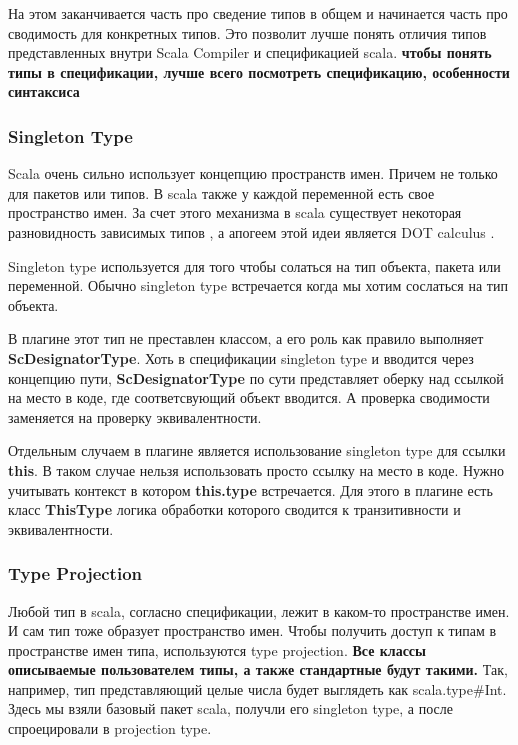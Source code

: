 На этом заканчивается часть про сведение типов в общем и начинается часть про
сводимость для конкретных типов.
Это позволит лучше понять отличия типов представленных внутри Scala Compiler
и спецификацией scala.
\textbf{чтобы понять типы в спецификации, лучше всего посмотреть спецификацию,
особенности синтаксиса}

%

\subsubsection{Singleton Type}
Scala очень сильно использует концепцию пространств имен.
Причем не только для пакетов или типов.
В scala также у каждой переменной есть свое пространство имен.
За счет этого механизма в scala существует некоторая разновидность зависимых
типов \cite{dependent_type}, а апогеем этой идеи является DOT calculus
\cite{dot_calculus}.

Singleton type используется для того чтобы солаться на тип объекта, пакета или
переменной.
Обычно singleton type встречается когда мы хотим сослаться на тип объекта.

В плагине этот тип не преставлен классом, а его роль как правило выполняет
\textbf{ScDesignatorType}.
Хоть в спецификации singleton type и вводится через концепцию пути,
\textbf{ScDesignatorType} по сути представляет оберку над ссылкой на место в коде,
где соответсвующий объект вводится.
А проверка сводимости заменяется на проверку эквивалентности.

Отдельным случаем в плагине является использование singleton type для ссылки
\textbf{this}.
В таком случае нельзя использовать просто ссылку на место в коде.
Нужно учитывать контекст в котором \textbf{this.type} встречается.
Для этого в плагине есть класс \textbf{ThisType} логика обработки которого
сводится к транзитивности и эквивалентности.


\subsubsection{Type Projection}

Любой тип в scala, согласно спецификации, лежит в каком-то пространстве имен.
И сам тип тоже образует пространство имен.
Чтобы получить доступ к типам в пространстве имен типа, используются
type projection.
\textbf{Все классы описываемые пользователем типы, а также стандартные будут такими.}
Так, например, тип представляющий целые числа будет выглядеть как
scala.type\#Int.
Здесь мы взяли базовый пакет scala, получли его singleton type, а после
спроецировали в projection type.

